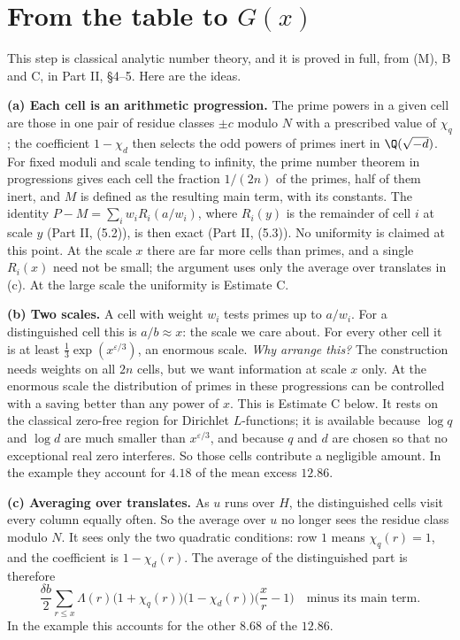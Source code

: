 \documentclass[11pt,letterpaper]{article}
\begin{document}
\section{From the table to $G(x)$}

This step is classical analytic number theory, and it is proved in full, from (M), B and C, in Part II, \S4--5.
Here are the ideas.

\textbf{(a) Each cell is an arithmetic progression.} The prime powers in a given cell are those in one pair
of residue classes $\pm c$ modulo $N$ with a prescribed value of $\chi_q$; the coefficient $1-\chi_d$ then
selects the odd powers of primes inert in $\Q(\sqrt{-d})$. For fixed moduli and scale tending to infinity,
the prime number theorem in progressions gives each cell the fraction $1/(2n)$ of the primes, half of them
inert, and $M$ is defined as the resulting main term, with its constants. The identity
$P-M=\sum_iw_iR_i(a/w_i)$, where $R_i(y)$ is the remainder of cell $i$ at scale $y$ (Part II, (5.2)), is then
exact (Part II, (5.3)). No uniformity is claimed at this point. At the scale $x$ there are far more cells
than primes, and a single $R_i(x)$ need not be small; the argument uses only the average over translates
in (c). At the large scale the uniformity is Estimate C.

\textbf{(b) Two scales.} A cell with weight $w_i$ tests primes up to $a/w_i$. For a distinguished cell this
is $a/b\approx x$: the scale we care about. For every other cell it is at least $\frac13\exp(x^{\varepsilon/3})$,
an enormous scale. \emph{Why arrange this?} The construction needs weights on all $2n$ cells, but we want
information at scale $x$ only. At the enormous scale the distribution of primes in these progressions can be controlled with a saving
better than any power of $x$. This is Estimate C below. It rests on the classical zero-free region for
Dirichlet $L$-functions; it is available because $\log q$ and $\log d$ are much smaller than
$x^{\varepsilon/3}$, and because $q$ and $d$ are chosen so that no exceptional real zero interferes. So those
cells contribute a negligible amount. In the example they account for $4.18$ of the mean excess $12.86$.

\textbf{(c) Averaging over translates.} As $u$ runs over $H$, the distinguished cells visit every column
equally often. So the average over $u$ no longer sees the residue class modulo $N$. It sees only the two
quadratic conditions: row $1$ means $\chi_q(r)=1$, and the coefficient is $1-\chi_d(r)$. The average of the
distinguished part is therefore
\begin{equation}\label{D:28}
 \frac{\delta b}{2}\sum_{r\le x}\Lambda(r)\big(1+\chi_q(r)\big)\big(1-\chi_d(r)\big)\Big(\frac xr-1\Big)
 \quad\text{minus its main term.}
\end{equation}
In the example this accounts for the other $8.68$ of the $12.86$.
\end{document}
